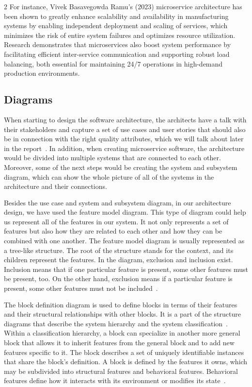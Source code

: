 \documentclass{article}
\begin{document}
\begin{multicols}{2}
For instance, Vivek Basavegowda Ramu's (2023) microservice architecture has been shown to greatly enhance scalability and availability in manufacturing systems by enabling independent deployment and scaling of services, which minimizes the risk of entire system failures and optimizes resource utilization. Research demonstrates that microservices also boost system performance by facilitating efficient inter-service communication and supporting robust load balancing, both essential for maintaining 24/7 operations in high-demand production environments. 

\subsection{Diagrams}
When starting to design the software architecture, the architects have a talk with their stakeholders and capture a set of use cases and user stories that should also be in connection with the right quality attributes, which we will talk about later in the report~\cite{b1}. In addition, when creating microservice software, the architecture would be divided into multiple systems that are connected to each other. Moreover, some of the next steps would be creating the system and subsystem diagram, which can show the whole picture of all of the systems in the architecture and their connections.

Besides the use case and system and subsystem diagram, in our architecture design, we have used the feature model diagram. This type of diagram could help us represent all of the features in our system. It not only represents a set of features but also how they are related to each other and how they can be combined with one another. The feature model diagram is usually represented as a tree-like structure. The root of the structure stands for the context, and its children represent the features. In the diagram, exclusion and inclusion exist. Inclusion means that if one particular feature is present, some other features must be present, too. On the other hand, exclusion means if a particular feature is present, some other features must not be included~\cite{b3}. 

The block definition diagram is used to define blocks in terms of their features and their structural relationships with other blocks. It is a part of the structure diagrams that describe the system hierarchy and the system classification~\cite{b4}. Within a classification hierarchy, a block can specialize in another more general block that allows it to inherit features from the general block and to add new features specific to it. The block describes a set of uniquely identifiable instances that share the block’s definition. A block is defined by the features it owns, which may be subdivided into structural features and behavioral features. Behavioral features define how it interacts with its environment or modifies its state~\cite{b4}. 


\end{multicols}
\end{document}
